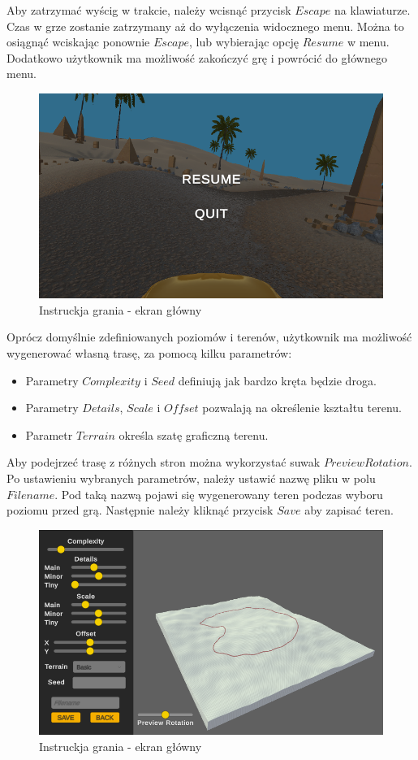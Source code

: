     Aby zatrzymać wyścig w trakcie, należy wcisnąć przycisk $Escape$ na klawiaturze. Czas w grze zostanie zatrzymany aż do wyłączenia widocznego menu.
    Można to osiągnąć wciskając ponownie $Escape$, lub wybierając opcję $Resume$ w menu. Dodatkowo użytkownik ma możliwość zakończyć grę i powrócić
    do głównego menu.
    \begin{figure}[H]
        \centering
        \includegraphics[width=.7\textwidth]{figures/game_instruction_pause.png}
        \caption{Instruckja grania - ekran główny}
        \label{fig}
    \end{figure}
    \clearpage
    Oprócz domyślnie zdefiniowanych poziomów i terenów, użytkownik ma możliwość wygenerować własną trasę, za pomocą kilku parametrów:
    \begin{itemize}
        \item Parametry $Complexity$ i $Seed$ definiują jak bardzo kręta będzie droga.
        \item Parametry $Details$, $Scale$ i $Offset$ pozwalają na określenie kształtu terenu.
        \item Parametr $Terrain$ określa szatę graficzną terenu.
    \end{itemize}
    Aby podejrzeć trasę z różnych stron można wykorzystać suwak $Preview Rotation$.\\
    Po ustawieniu wybranych parametrów, należy ustawić nazwę pliku w polu $Filename$. Pod taką nazwą pojawi się 
    wygenerowany teren podczas wyboru poziomu przed grą. Następnie należy kliknąć przycisk $Save$ aby zapisać teren.
    \begin{figure}[H]
        \centering
        \includegraphics[width=.7\textwidth]{figures/game_instruction_create.png}
        \caption{Instruckja grania - ekran główny}
        \label{fig}
    \end{figure}
